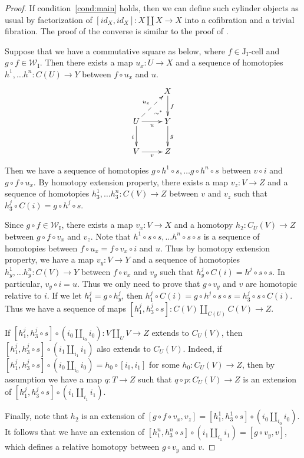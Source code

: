 \documentclass{tac}
\theoremstyle{definition}
\newcommand{\we}{\mathcal{W}}
\newcommand{\I}{\mathrm{I}}
\newcommand{\J}{\mathrm{J}}
\newcommand{\class}[2]{#1\text{-}\mathrm{#2}}
\newcommand{\Icell}[1][\I]{\class{#1}{cell}}
\newcommand{\Jcell}[1][]{\Icell[\J#1]}
\newcommand{\cyli}{i}
\begin{document}
\begin{proof}
If condition~\eqref{cond:main} holds, then we can define such cylinder objects as usual by factorization of $[id_X,id_X] : X \amalg X \to X$ into a cofibration and a trivial fibration.
The proof of the converse is similar to the proof of .

Suppose that we have a commutative square as below, where $f \in \Jcell[_\I]$ and $g \circ f \in \we_\I$.
Then there exists a map $u_x : U \to X$ and a sequence of homotopies $h^1, \ldots h^n : C(U) \to Y$ between $f \circ u_x$ and $u$.
\[ \xymatrix{   \ar@{}[dr]|(.7){\sim^*}               & X \ar[d]^f \\
              U \ar@{-->}[ur]^{u_x} \ar[d]_i \ar[r]_u & Y \ar[d]^g \\
              V \ar[r]_v                              & Z
            } \]
Then we have a sequence of homotopies $g \circ h^1 \circ s, \ldots g \circ h^n \circ s$ between $v \circ i$ and $g \circ f \circ u_x$.
By homotopy extension property, there exists a map $v_z : V \to Z$ and a sequence of homotopies $h^1_3, \ldots h^n_3 : C(V) \to Z$ between $v$ and $v_z$ such that $h^j_3 \circ C(i) = g \circ h^j \circ s$.

Since $g \circ f \in \we_\I$, there exists a map $v_x : V \to X$ and a homotopy $h_2 : C_U(V) \to Z$ between $g \circ f \circ v_x$ and $v_z$.
Note that $h^1 \circ s \circ s, \ldots h^n \circ s \circ s$ is a sequence of homotopies between $f \circ u_x = f \circ v_x \circ i$ and $u$.
Thus by homotopy extension property, we have a map $v_y : V \to Y$ and a sequence of homotopies $h^1_y, \ldots h^n_y : C(V) \to Y$ between $f \circ v_x$ and $v_y$ such that $h^j_y \circ C(i) = h^j \circ s \circ s$.
In particular, $v_y \circ i = u$.
Thus we only need to prove that $g \circ v_y$ and $v$ are homotopic relative to $i$.
If we let $h^j_1 = g \circ h^j_y$, then $h^j_1 \circ C(i) = g \circ h^j \circ s \circ s = h^j_3 \circ s \circ C(i)$.
Thus we have a sequence of maps $[h^j_1, h^j_3 \circ s] : C(V) \amalg_{C(U)} C(V) \to Z$.

If $[h^j_1, h^j_3 \circ s] \circ (\cyli_0 \amalg_{\cyli_0} \cyli_0) : V \amalg_U V \to Z$ extends to $C_U(V)$, then $[h^j_1, h^j_3 \circ s] \circ (\cyli_1 \amalg_{\cyli_1} \cyli_1)$ also extends to $C_U(V)$.
Indeed, if $[h^j_1, h^j_3 \circ s] \circ (\cyli_0 \amalg_{\cyli_0} \cyli_0) = h_0 \circ [\cyli_0,\cyli_1]$ for some $h_0 : C_U(V) \to Z$, then by assumption we have a map $q : T \to Z$
such that $q \circ p : C_U(V) \to Z$ is an extension of $[h^j_1, h^j_3 \circ s] \circ (\cyli_1 \amalg_{\cyli_1} \cyli_1)$.

Finally, note that $h_2$ is an extension of $[g \circ f \circ v_x, v_z] = [h^1_1, h^1_3 \circ s] \circ (\cyli_0 \amalg_{\cyli_0} \cyli_0)$.
It follows that we have an extension of $[h^n_1, h^n_3 \circ s] \circ (\cyli_1 \amalg_{\cyli_1} \cyli_1) = [g \circ v_y, v]$,
which defines a relative homotopy between $g \circ v_y$ and $v$.
\end{proof}
\end{document}
